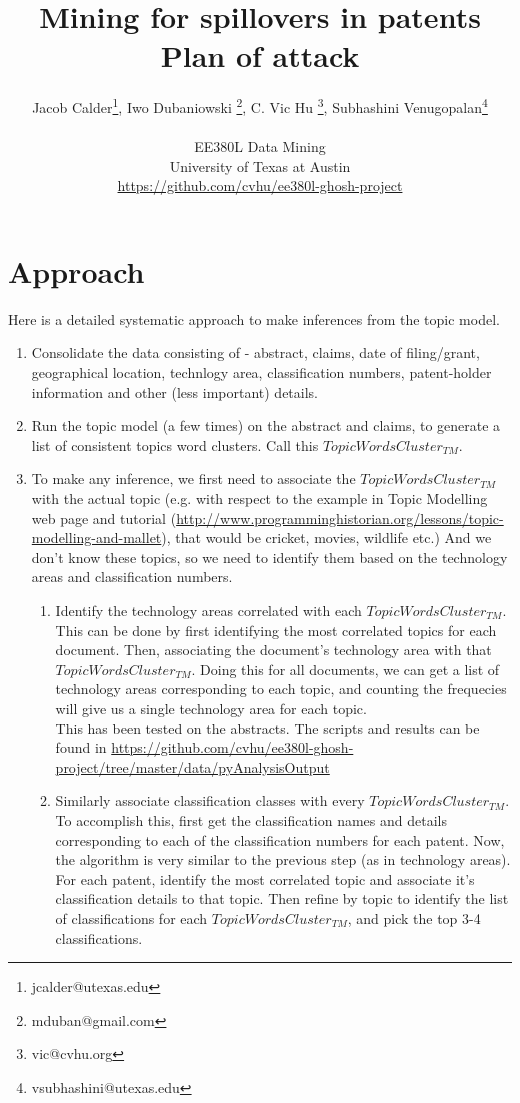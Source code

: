 \documentclass[11pt]{article}
\author{Jacob Calder\footnote{jcalder@utexas.edu}, Iwo Dubaniowski \footnote{mduban@gmail.com}, C. Vic Hu \footnote{vic@cvhu.org}, Subhashini Venugopalan\footnote{vsubhashini@utexas.edu}\\[4pt]
\-\\
EE380L Data Mining\\
University of Texas at Austin\\
\url{https://github.com/cvhu/ee380l-ghosh-project}
}
\title{Mining for spillovers in patents \\ Plan of attack}
\begin{document}
\sloppy

\maketitle
\section{Approach}
Here is a detailed systematic approach to make inferences from the topic model.
\begin{enumerate}
\item Consolidate the data consisting of - abstract, claims, date of filing/grant, geographical location, technlogy area, classification numbers, patent-holder information and other (less important) details.
\item Run the topic model (a few times) on the abstract and claims, to generate a list of consistent topics word clusters. Call this $TopicWordsCluster_{TM}$.
\item To make any inference, we first need to associate the $TopicWordsCluster_{TM}$ with the actual topic (e.g. with respect to the example in Topic Modelling web page and tutorial (\url{http://www.programminghistorian.org/lessons/topic-modelling-and-mallet}), that would be cricket, movies, wildlife etc.) And we don't know these topics, so we need to identify them based on the technology areas and classification numbers. \label{topicwords2topics}
\begin{enumerate}
 \item Identify the technology areas correlated with each $TopicWordsCluster_{TM}$. \\
This can be done by first identifying the most correlated topics for each document. Then, associating the document's technology area with that $TopicWordsCluster_{TM}$. Doing this for all documents, we can get a list of technology areas corresponding to each topic, and counting the frequecies will give us a single technology area for each topic. \\
This has been tested on the abstracts. The scripts and results can be found in \url{https://github.com/cvhu/ee380l-ghosh-project/tree/master/data/pyAnalysisOutput}

\item Similarly associate classification classes with every $TopicWordsCluster_{TM}$. \\
To accomplish this, first get the classification names and details corresponding to each of the classification numbers for each patent. Now, the algorithm is very similar to the previous step (as in technology areas). For each patent, identify the most correlated topic and associate it's classification details to that topic. Then refine by topic to identify the list of classifications for each $TopicWordsCluster_{TM}$, and pick the top 3-4 classifications.
\end{enumerate}


\end{enumerate}
\end{document}
